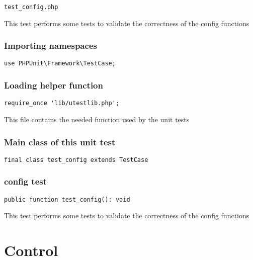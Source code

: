 \documentclass[a4paper]{article}
\begin{document}
\begin{lstlisting}
test_config.php
\end{lstlisting}

This test performs some tests to validate the correctness
of the config functions

\hypertarget{toc105}{}
\subsubsection{Importing namespaces}

\begin{lstlisting}
use PHPUnit\Framework\TestCase;
\end{lstlisting}

\hypertarget{toc106}{}
\subsubsection{Loading helper function}

\begin{lstlisting}
require_once 'lib/utestlib.php';
\end{lstlisting}

This file contains the needed function used by the unit tests

\hypertarget{toc107}{}
\subsubsection{Main class of this unit test}

\begin{lstlisting}
final class test_config extends TestCase
\end{lstlisting}

\hypertarget{toc108}{}
\subsubsection{config test}

\begin{lstlisting}
public function test_config(): void
\end{lstlisting}

This test performs some tests to validate the correctness
of the config functions


\hypertarget{toc109}{}
\section{Control}

\hypertarget{toc110}{}
\end{document}
